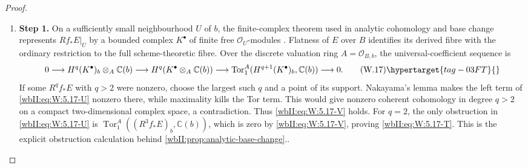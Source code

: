 \begin{proof}
\begin{enumerate}[label={$\langle1\rangle$\arabic*.},leftmargin=*]
\item 
\noindent\textbf{Step 1.} On a sufficiently small neighbourhood $U$ of $b$, the finite-complex theorem
used in analytic cohomology and base change represents $Rf_*E|_U$ by a
bounded complex $K^\bullet$ of finite free $\mathcal O_U$-modules
\cite[Chapter~III, \S4, Theorem~4.1, p.~124]{BS76push}.  Flatness of
$E$ over $B$ identifies its derived fibre with the ordinary restriction to
the full scheme-theoretic fibre.  Over the discrete valuation ring
$A=\mathcal O_{B,b}$, the universal-coefficient sequence is
\[
0\longrightarrow H^q(K^\bullet)_b\otimes_A\mathbb C(b)
 \longrightarrow H^q(K^\bullet\otimes_A\mathbb C(b))
 \longrightarrow
 \operatorname{Tor}_1^A(H^{q+1}(K^\bullet)_b,\mathbb C(b))
 \longrightarrow0.
\tag{W.17}\hypertarget{tag-03FT}{}\label{wbII:eq:W:5.17-U}
\]
If some $R^qf_*E$ with $q>2$ were nonzero, choose the largest such $q$ and a
point of its support.  Nakayama's lemma makes the left term of \eqref{wbII:eq:W:5.17-U}
nonzero there, while maximality kills the Tor term.  This would give nonzero
coherent cohomology in degree $q>2$ on a compact two-dimensional complex
space, a contradiction.  Thus \eqref{wbII:eq:W:5.17-V} holds.  For $q=2$, the only
obstruction in \eqref{wbII:eq:W:5.17-U} is
$\operatorname{Tor}_1^A((R^3f_*E)_b,\mathbb C(b))$, which is zero by
\eqref{wbII:eq:W:5.17-V}, proving \eqref{wbII:eq:W:5.17-T}.  This is the explicit obstruction calculation
behind \cref{wbII:prop:analytic-base-change}..

\end{enumerate}
\end{proof}
